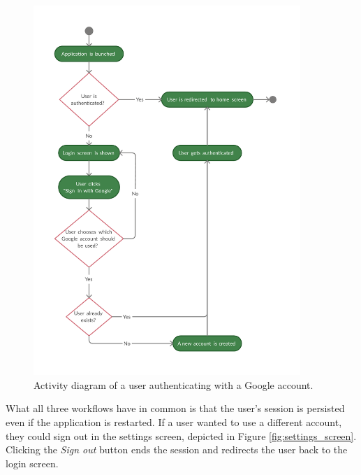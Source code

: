 \documentclass[
  digital, %
  table,   %
  oneside, %
  lof,     %
  lot,     %
]{fithesis3}
\begin{document}
\begin{enumerate}
    \begin{figure}
        \begin{center}
            \includegraphics[width=0.9\textwidth]{figures/diagrams/Google_auth_flow}
        \end{center}
        \caption{Activity diagram of a user authenticating with a Google account.}
        \label{fig:google_auth_flow}
    \end{figure}
\end{enumerate}

What all three workflows have in common is that the user's session is persisted even if the application is restarted.
If a user wanted to use a different account, they could sign out in the settings screen, depicted in Figure \ref{fig:settings_screen}. Clicking the \textit{Sign out} button ends the session and redirects the user back to the login screen.
\end{document}
